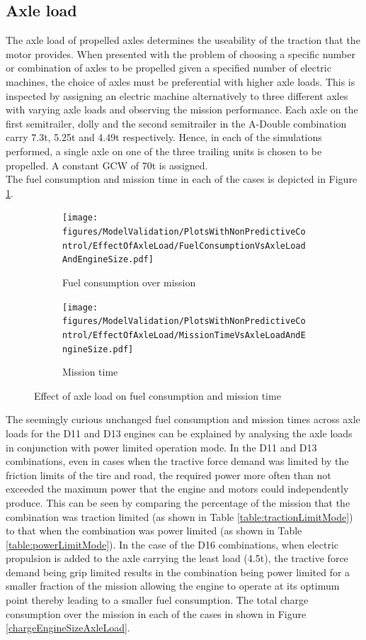 \documentclass[ExampleMasters.tex]{subfiles}
\begin{document}
	\subsection{Axle load}
	The axle load of propelled axles determines the useability of the traction that the motor provides. When presented with the problem of choosing a specific number or combination of axles to be propelled given a specified number of electric machines, the choice of axles must be preferential with higher axle loads. This is inspected by assigning an electric machine alternatively to three different axles with varying axle loads and observing the mission performance. Each axle on the first semitrailer, dolly and the second semitrailer in the A-Double combination carry 7.3t, 5.25t and 4.49t respectively. Hence, in each of the simulations performed, a single axle on one of the three trailing units is chosen to be propelled. A constant GCW of 70t is assigned.\\
	The fuel consumption and mission time in each of the cases is depicted in Figure \ref{fuelTimeEngineAxleLoad}.
	\begin{figure}
	\begin{subfigure}{.5\textwidth}
	\centering
	\texttt{[image: figures/ModelValidation/PlotsWithNonPredictiveControl/EffectOfAxleLoad/FuelConsumptionVsAxleLoadAndEngineSize.pdf]}
	\caption{Fuel consumption over mission}
	\end{subfigure}
	\begin{subfigure}{.5\textwidth}
	\centering
	\texttt{[image: figures/ModelValidation/PlotsWithNonPredictiveControl/EffectOfAxleLoad/MissionTimeVsAxleLoadAndEngineSize.pdf]}
	\caption{Mission time}
	\end{subfigure}
	\caption{Effect of axle load on fuel consumption and mission time}
	\label{fuelTimeEngineAxleLoad}
	\end{figure}
	The seemingly curious unchanged fuel consumption and mission times across axle loads for the D11 and D13 engines can be explained by analysing the axle loads in conjunction with power limited operation mode. In the D11 and D13 combinations, even in cases when the tractive force demand was limited by the friction limits of the tire and road, the required power more often than not exceeded the maximum power that the engine and motors could independently produce. This can be seen by comparing the percentage of the mission that the combination was traction limited (as shown in Table \ref{table:tractionLimitMode}) to that when the combination was power limited (as shown in Table \ref{table:powerLimitMode}). In the case of the D16 combinations, when electric propulsion is added to the axle carrying the least load (4.5t), the tractive force demand being grip limited results in the combination being power limited for a smaller fraction of the mission allowing the engine to operate at its optimum point thereby leading to a smaller fuel consumption. The total charge consumption over the mission in each of the cases in shown in Figure \ref{chargeEngineSizeAxleLoad}.
\end{document}
